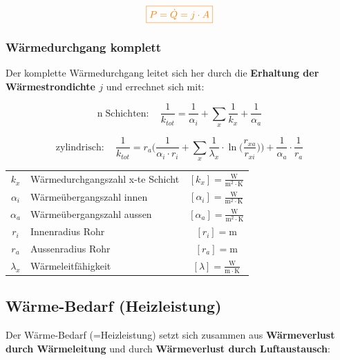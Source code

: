 $$ \textcolor{orange}{  \boxed{ P =  \dot{Q} = j \cdot A } } $$ 




\vfill\null
\columnbreak



\subsubsection{Wärmedurchgang komplett}

Der komplette Wärmedurchgang leitet sich her durch die \textbf{Erhaltung der Wärmestrondichte $j$} und errechnet sich mit:


$$ \boxed{\mathrm{n \; Schichten:} \quad \frac{1}{k_{tot}} = \frac{1}{\alpha_i} + \sum_x  \frac{1}{k_x} + \frac{1}{\alpha_a}  }  $$

$$ \boxed{\mathrm{zylindrisch:} \quad \frac{1}{k_{tot}} = r_a \Big(  \frac{1}{\alpha_i \cdot r_i} + \sum_x \frac{1}{\lambda_x} \cdot \ln \big( \frac{r_{xa}}{r_{xi}} \big) \Big) + \frac{1}{\alpha_a} \cdot \frac{1}{r_a}  }  $$




\begin{tabular}{c l c}
	\rule{0pt}{10pt}$k_x$ & Wärmedurchgangszahl x-te Schicht & $[k_x] = \mathrm{\frac{W}{m^2 \cdot K}}$ \\
	\rule{0pt}{10pt}$\alpha_i$ & Wärmeübergangszahl innen & $[\alpha_i] = \mathrm{\frac{W}{m^2 \cdot K}} $\\
	\rule{0pt}{10pt}$\alpha_a$ & Wärmeübergangszahl aussen & $[\alpha_a] = \mathrm{\frac{W}{m^2 \cdot K}} $\\
	$r_i$ & Innenradius Rohr & $[r_i] = \mathrm{m}$	 \\
	$r_a$ & Aussenradius Rohr & $[r_a] = \mathrm{m}$	 \\
	\rule{0pt}{10pt}$\lambda_x$ & Wärmeleitfähigkeit & $[\lambda] = \mathrm{\frac{W}{m \cdot K}} $\\
\end{tabular}





\subsection{Wärme-Bedarf (Heizleistung)}
Der Wärme-Bedarf (=Heizleistung) setzt sich zusammen aus \textbf{Wärmeverlust durch Wärmeleitung} und durch \textbf{Wärmeverlust durch Luftaustausch}: 

